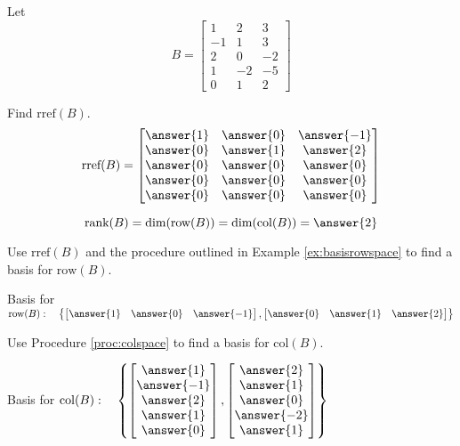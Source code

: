 \documentclass{ximera}
\begin{document}
\begin{problem} \label{prob:colrowmatrixB}
Let
$$B=\begin{bmatrix}1&2&3\\-1&1&3\\2&0&-2\\1&-2&-5\\0&1&2\end{bmatrix}$$

\begin{problem}
Find $\mbox{rref}(B)$.
$$\mbox{rref}(B)=\begin{bmatrix}\answer{1}&\answer{0}&\answer{-1}\\\answer{0}&\answer{1}&\answer{2}\\\answer{0}&\answer{0}&\answer{0}\\\answer{0}&\answer{0}&\answer{0}\\\answer{0}&\answer{0}&\answer{0}\end{bmatrix}$$
\end{problem}

\begin{problem}
$$\mbox{rank}(B)=\mbox{dim}(\mbox{row}(B))=\mbox{dim}(\mbox{col}(B))=\answer{2}$$
\end{problem}

\begin{problem}
Use $\mbox{rref}(B)$ and the procedure outlined in Example \ref{ex:basisrowspace} to find a basis for $\mbox{row}(B)$.

Basis for $\mbox{row}(B):\quad
\left\{\begin{bmatrix}\answer{1}& \answer{0}& \answer{-1}\end{bmatrix},\begin{bmatrix}\answer{0} & \answer{1}& \answer{2}\end{bmatrix} \right\}$
\end{problem}

\begin{problem}
Use Procedure \ref{proc:colspace} to find a basis for $\mbox{col}(B)$.

Basis for $\mbox{col}(B):\quad
\left\{ \begin{bmatrix}\answer{1}\\\answer{-1}\\\answer{2}\\\answer{1}\\\answer{0}\end{bmatrix}, \begin{bmatrix}\answer{2}\\\answer{1}\\\answer{0}\\\answer{-2}\\\answer{1}\end{bmatrix}\right\}$
\end{problem}

\end{problem}
\end{document}
